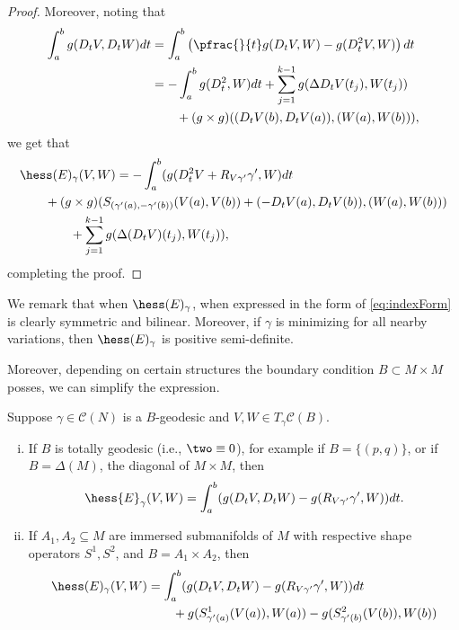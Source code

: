 \begin{proof}
Moreover, noting that
\begin{align*}
	\int_a^bg(D_tV,D_tW)dt&=\int_a^b\left(\pfrac{}{t}g(D_tV,W)-g(D_t^2V,W)\right)dt\\
	&=-\int_a^bg(D_t^2,W)dt+\sum_{j=1}^{k-1}g(\Delta D_tV(t_j),W(t_j))\\
	&\qquad +(g\times g)((D_tV(b),D_tV(a)),(W(a),W(b))),
\end{align*}
we get that
\begin{align*}
		&\hess(E)_\gamma(V,W)=-\int_a^b(g(D_t^2V+R_{V\gamma'}\gamma',W)dt\\
		&\qquad +(g\times g)(S_{(\gamma'(a),-\gamma'(b))}(V(a),V(b))+(-D_tV(a),D_tV(b)),(W(a),W(b)))\\
		&\qquad\qquad +\sum_{j=1}^{k-1}g(\Delta(D_tV)(t_j),W(t_j)),
\end{align*}
completing the proof.
\end{proof}

We remark that when $\hess(E)_\gamma$, when expressed in the form of \cref{eq:indexForm} is clearly symmetric and bilinear.  Moreover, if $\gamma$ is minimizing for all nearby variations, then $\hess(E)_\gamma$ is positive semi-definite.

Moreover, depending on certain structures the boundary condition $B\subset M\times M$ posses, we can simplify the expression.

\begin{cor}
    Suppose $\gamma\in\mathcal{C}(N)$ is a $B$-geodesic and $V,W\in T_\gamma\mathcal{C}(B)$.
    \begin{enumerate}[i.]
    	\item If $B$ is totally geodesic (i.e., $\two\equiv0$), for example if $B=\{(p,q)\}$, or if $B=\Delta(M)$, the diagonal of $M\times M$, then
    	$$\hess{E}_\gamma(V,W)=\int_a^b(g(D_tV,D_tW)-g(R_{V\gamma'}\gamma',W))dt.$$	
    	\item If $A_1, A_2\subseteq M$ are immersed submanifolds of $M$ with respective shape operators $S^1, S^2$, and $B=A_1\times A_2$, then
    	\begin{align*}
    		\hess(E)_\gamma(V,W)&=\int_a^b(g(D_tV,D_tW)-g(R_{V\gamma'}\gamma',W))dt\\
    		&\qquad +g(S^1_{\gamma'(a)}(V(a)),W(a))-g(S^2_{\gamma'(b)}(V(b)),W(b))
    	\end{align*}
    \end{enumerate}

\end{cor}

























